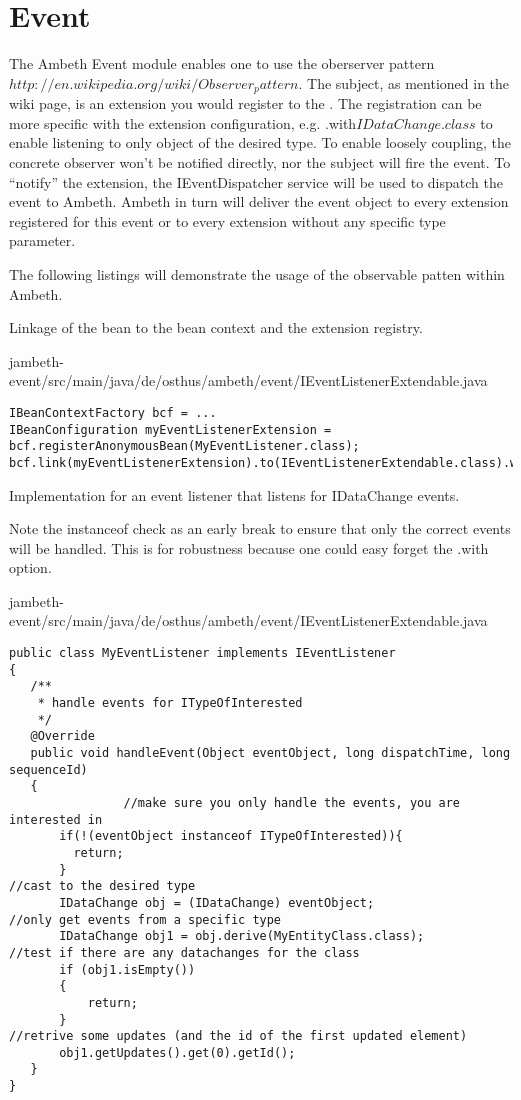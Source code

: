 \section{Event}
\label{module:Event}
\ClearAPI
\TODO
The Ambeth Event module enables one to use the oberserver pattern \(http://en.wikipedia.org/wiki/Observer_pattern\). 
The subject, as mentioned in the wiki page, is an extension you would register to the . The registration can be more specific with the extension configuration, e.g. .with\(IDataChange.class\) to enable listening to only object of the desired type.
To enable loosely coupling, the concrete observer won't be notified directly, nor the subject will fire the event. To "`notify"' the extension, the IEventDispatcher service will be used to dispatch the event to Ambeth. Ambeth in turn will deliver the event object to every extension registered for this event or to every extension without any specific type parameter.

The following listings will demonstrate the usage of the observable patten within Ambeth.

Linkage of the bean to the bean context and the extension registry.

{jambeth-event/src/main/java/de/osthus/ambeth/event/IEventListenerExtendable.java}
\begin{lstlisting}[style=Java,caption={Example registration of an EventListener}]
IBeanContextFactory bcf = ...
IBeanConfiguration myEventListenerExtension = bcf.registerAnonymousBean(MyEventListener.class);
bcf.link(myEventListenerExtension).to(IEventListenerExtendable.class).with(IDataChange.class);
\end{lstlisting}

Implementation for an event listener that listens for IDataChange events.

Note the instanceof check as an early break to ensure that only the correct events will be handled. This is for robustness because one could easy forget the .with\(\) option.

{jambeth-event/src/main/java/de/osthus/ambeth/event/IEventListenerExtendable.java}
\begin{lstlisting}[style=Java,caption={}]
public class MyEventListener implements IEventListener
{
   /**
    * handle events for ITypeOfInterested
    */
   @Override
   public void handleEvent(Object eventObject, long dispatchTime, long sequenceId)
   {
				//make sure you only handle the events, you are interested in
       if(!(eventObject instanceof ITypeOfInterested)){
         return;
       }
//cast to the desired type
       IDataChange obj = (IDataChange) eventObject;
//only get events from a specific type
       IDataChange obj1 = obj.derive(MyEntityClass.class);
//test if there are any datachanges for the class
       if (obj1.isEmpty())
       {
           return;
       }
//retrive some updates (and the id of the first updated element)
       obj1.getUpdates().get(0).getId();
   }
}
\end{lstlisting}

